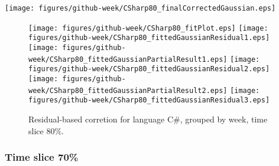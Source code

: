 \begin{center}
{\texttt{[image: figures/github-week/CSharp80\_finalCorrectedGaussian.eps]}}
\end{center}

\FloatBarrier

\begin{figure}[t]
\centering
{}
{\texttt{[image: figures/github-week/CSharp80\_fitPlot.eps]}}
{\texttt{[image: figures/github-week/CSharp80\_fittedGaussianResidual1.eps]}}
{\texttt{[image: figures/github-week/CSharp80\_fittedGaussianPartialResult1.eps]}}
{\texttt{[image: figures/github-week/CSharp80\_fittedGaussianResidual2.eps]}}
{\texttt{[image: figures/github-week/CSharp80\_fittedGaussianPartialResult2.eps]}}
{\texttt{[image: figures/github-week/CSharp80\_fittedGaussianResidual3.eps]}}
\caption{Residual-based corretion for language C\#, grouped by week, time slice 80\%.}
\end{figure}


\FloatBarrier


\subsubsection{Time slice 70\%}

